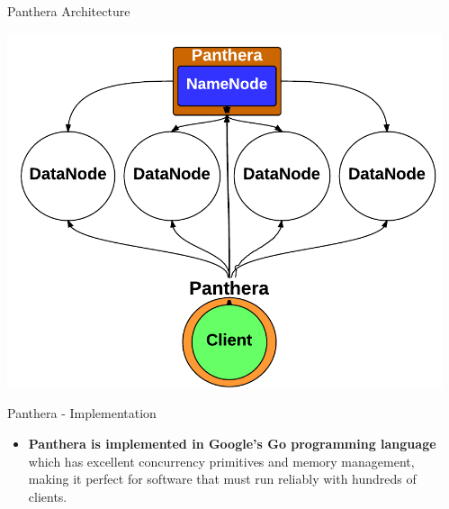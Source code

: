 \documentclass[final]{beamer} %
\begin{document}
\begin{frame}
\begin{columns}[t]
\begin{column}{0.32\textwidth}
     \end{column}

    \begin{column}{0.32\textwidth}
		\begin{block}{Panthera Architecture}
		\vspace{0.5em}
		\centerline{\includegraphics[scale=1.4]{assets/v2/panthera_hadoop_arch.pdf}}	  
	  \end{block}   	  


      

	\begin{block}{Panthera - Implementation}
	\begin{itemize}
		\item \textbf{Panthera is implemented in Google's Go programming language} which has excellent concurrency primitives and memory management, making it perfect for software that must run reliably with hundreds of clients.
	\end{itemize}
	\end{block}
	

\end{column}
\end{columns}
\end{frame}
\end{document}
